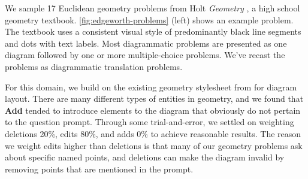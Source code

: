 We sample 17 Euclidean geometry problems from Holt \textit{Geometry} \cite{holtGeometry}, a high school geometry textbook. \cref{fig:edgeworth-problems} (left) shows an example problem. The textbook uses a consistent visual style of predominantly black line segments and dots with text labels. Most diagrammatic problems are presented as one diagram followed by one or more multiple-choice problems. We've recast the problems as diagrammatic translation problems.

For this domain, we build on the existing geometry stylesheet from \Penrose \cite[Section~5.3]{penrose} for diagram layout. There are many different types of entities in geometry, and we found that \textbf{Add} tended to introduce elements to the diagram that obviously do not pertain to the question prompt.
Through some trial-and-error, we settled on weighting deletions 20\%, edits 80\%, and adds 0\% to achieve reasonable results. The reason we weight edits higher than deletions is that many of our geometry problems ask about specific named points, and deletions can make the diagram invalid by removing points that are mentioned in the prompt.



